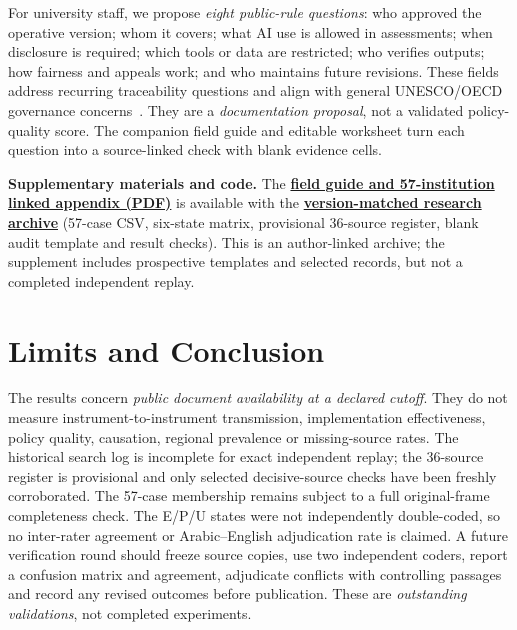 \documentclass[conference,letterpaper]{IEEEtran}
\newif\ifblind
\begin{document}
For university staff, we propose \emph{eight public-rule questions}: who approved the operative version; whom it covers; what AI use is allowed in assessments; when disclosure is required; which tools or data are restricted; who verifies outputs; how fairness and appeals work; and who maintains future revisions. These fields address recurring traceability questions and align with general UNESCO/OECD governance concerns~\cite{unesco,oecd}. They are a \emph{documentation proposal}, not a validated policy-quality score. The companion field guide and editable worksheet turn each question into a source-linked check with blank evidence cells.

\ifblind
\noindent\textbf{Supplementary materials.} An anonymous companion PDF presents the 57-institution evidence/search key, plus a practical source-coding and bilingual search template. For review-stage anonymity, repository ownership information is omitted here; author-identifying archival links will be added only if permitted by the venue.
\else
\noindent\textbf{Supplementary materials and code.} The \href{https://github.com/shaikhamalkawi-ux/From-AI-Strategy-to-University-Rules-in-the-GCC/blob/main/ICAMAC2026_Paper90_R5_57/supplement/ICAMAC_Paper90_R5_Evidence_Addendum_FieldGuide_and_57.pdf}{\textbf{field guide and 57-institution linked appendix (PDF)}} is available with the \href{https://github.com/shaikhamalkawi-ux/From-AI-Strategy-to-University-Rules-in-the-GCC/tree/main/ICAMAC2026_Paper90_R5_57}{\textbf{version-matched research archive}} (57-case CSV, six-state matrix, provisional 36-source register, blank audit template and result checks). This is an author-linked archive; the supplement includes prospective templates and selected records, but not a completed independent replay.
\fi

\section{Limits and Conclusion}
The results concern \emph{public document availability at a declared cutoff}. They do not measure instrument-to-instrument transmission, implementation effectiveness, policy quality, causation, regional prevalence or missing-source rates. The historical search log is incomplete for exact independent replay; the 36-source register is provisional and only selected decisive-source checks have been freshly corroborated. The 57-case membership remains subject to a full original-frame completeness check. The E/P/U states were not independently double-coded, so no inter-rater agreement or Arabic--English adjudication rate is claimed. A future verification round should freeze source copies, use two independent coders, report a confusion matrix and agreement, adjudicate conflicts with controlling passages and record any revised outcomes before publication. These are \emph{outstanding validations}, not completed experiments.
\end{document}

